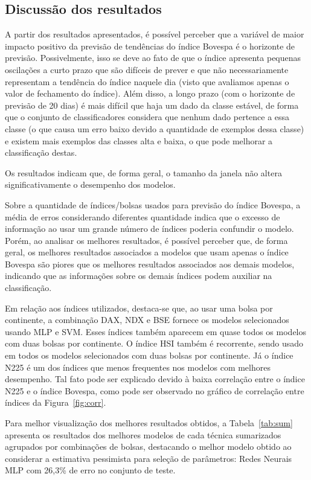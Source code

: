 \documentclass[12pt,a4paper,utf8]{ppgsi}
\begin{document}
    \subsection{Discussão dos resultados}

    A partir dos resultados apresentados, é possível perceber que a variável de maior impacto positivo da previsão de tendências do índice Bovespa é o horizonte de previsão. Possivelmente, isso se deve ao fato de que o índice apresenta pequenas oscilações a curto prazo que são difíceis de prever e que não necessariamente representam a tendência do índice naquele dia (visto que avaliamos apenas o valor de fechamento do índice). Além disso, a longo prazo (com o horizonte de previsão de 20 dias) é mais difícil que haja um dado da classe estável, de forma que o conjunto de classificadores considera que nenhum dado pertence a essa classe (o que causa um erro baixo devido a quantidade de exemplos dessa classe) e existem mais exemplos das classes alta e baixa, o que pode melhorar a classificação destas.

    Os resultados indicam que, de forma geral, o tamanho da janela não altera significativamente o desempenho dos modelos.

    Sobre a quantidade de índices/bolsas usados para previsão do índice Bovespa, a média de erros considerando diferentes quantidade indica que o excesso de informação ao usar um grande número de índices poderia confundir o modelo. Porém, ao analisar os melhores resultados, é possível perceber que, de forma geral, os melhores resultados associados a modelos que usam apenas o índice Bovespa são piores que os melhores resultados associados aos demais modelos, indicando que as informações sobre os demais índices podem auxiliar na classificação.

    Em relação aos índices utilizados, destaca-se que, ao usar uma bolsa por continente, a combinação DAX, NDX e BSE fornece os modelos selecionados usando MLP e SVM. Esses índices também aparecem em quase todos os modelos com duas bolsas por continente. O índice HSI também é recorrente, sendo usado em todos os modelos selecionados com duas bolsas por continente. Já o índice N225 é um dos índices que menos frequentes nos modelos com melhores desempenho. Tal fato pode ser explicado devido à baixa correlação entre o índice N225 e o índice Bovespa, como pode ser observado no gráfico de correlação entre índices da Figura~\ref{fig:corr}.
		
		
Para melhor visualização dos melhores resultados obtidos, a Tabela~\ref{tab:sum} apresenta os resultados dos melhores modelos de cada técnica sumarizados agrupados por combinações de bolsas, destacando o melhor modelo obtido ao considerar a estimativa pessimista para seleção de parâmetros: Redes Neurais MLP com 26,3\% de erro no conjunto de teste.
\end{document}

